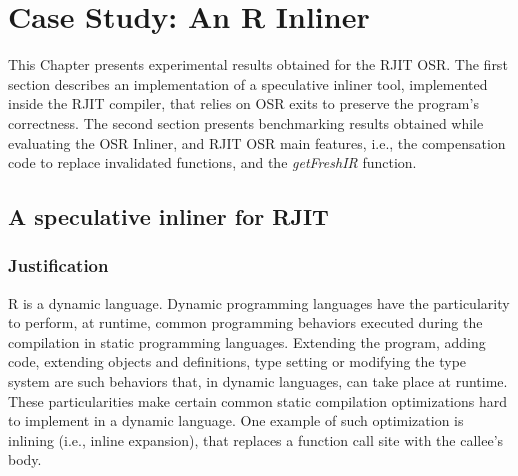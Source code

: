 
\chapter{Case Study: An R Inliner} %

\label{Chapter5} %


\newcommand{\keyword}[1]{\textbf{#1}}
\newcommand{\tabhead}[1]{\textbf{#1}}
\newcommand{\code}[1]{\texttt{#1}}
\newcommand{\file}[1]{\texttt{\bfseries#1}}
\newcommand{\option}[1]{\texttt{\itshape#1}}

This Chapter presents experimental results obtained for the RJIT OSR.
The first section describes an implementation of a speculative inliner tool, implemented inside the RJIT compiler, that relies on OSR exits to preserve the program's correctness.
The second section presents benchmarking results obtained while evaluating the OSR Inliner, and RJIT OSR main features, i.e., the compensation code to replace invalidated functions, and the \textit{getFreshIR} function.\\

\section{A speculative inliner for RJIT}
\subsection{Justification}
R is a dynamic language. 
Dynamic programming languages have the particularity to perform, at runtime, common programming behaviors executed during the compilation in static programming languages.
Extending the program, adding code, extending objects and definitions, type setting or modifying the type system are such behaviors that, in dynamic languages, can take place at runtime.
These particularities make certain common static compilation optimizations hard to implement in a dynamic language.
One example of such optimization is inlining (i.e., inline expansion), that replaces a function call site with the callee's body.\\

